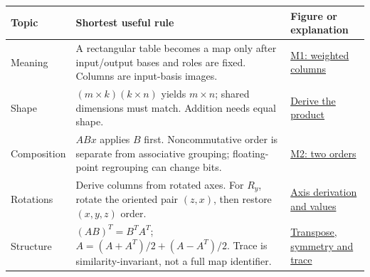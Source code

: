 {\def\LTcaptype{none} %
\begin{longtable}[]{@{}
  >{\raggedright\arraybackslash}p{}
  >{\raggedright\arraybackslash}p{}
  >{\raggedright\arraybackslash}p{}@{}}
\toprule\noalign{}
\begin{minipage}[b]{\linewidth}\raggedright
Topic
\end{minipage} & \begin{minipage}[b]{\linewidth}\raggedright
Shortest useful rule
\end{minipage} & \begin{minipage}[b]{\linewidth}\raggedright
Figure or explanation
\end{minipage} \\
\midrule\noalign{}
\endhead
\bottomrule\noalign{}
\endlastfoot
Meaning & A rectangular table becomes a map only after input/output bases and roles are fixed. Columns are input-basis images. & \href{Continuous\%20Notes/Computing\%20Foundations\%20-\%20From\%20Bits\%20to\%20C++\%20and\%20Systems\%20APIs\#Figure\%20M1\%20-\%20Coordinates\%20weight\%20the\%20new\%20basis\%20directions/}{M1: weighted columns} \\
Shape & \((m\times k)(k\times n)\) yields \(m\times n\); shared dimensions must match. Addition needs equal shape. & \href{Continuous\%20Notes/Computing\%20Foundations\%20-\%20From\%20Bits\%20to\%20C++\%20and\%20Systems\%20APIs\#Combining\%20rules\%20explains\%20the\%20multiplication\%20law/}{Derive the product} \\
Composition & \(ABx\) applies \(B\) first. Noncommutative order is separate from associative grouping; floating-point regrouping can change bits. & \href{Continuous\%20Notes/Computing\%20Foundations\%20-\%20From\%20Bits\%20to\%20C++\%20and\%20Systems\%20APIs\#Figure\%20M2\%20-\%20The\%20same\%20operations\%20give\%20different\%20results\%20in\%20different\%20orders/}{M2: two orders} \\
Rotations & Derive columns from rotated axes. For \(R_y\), rotate the oriented pair \((z,x)\), then restore \((x,y,z)\) order. & \href{Continuous\%20Notes/Computing\%20Foundations\%20-\%20From\%20Bits\%20to\%20C++\%20and\%20Systems\%20APIs\#The\%20oriented\%20plane\%20explains\%20the\%20Y-rotation\%20signs/}{Axis derivation and values} \\
Structure & \((AB)^T=B^TA^T\); \(A=(A+A^T)/2+(A-A^T)/2\). Trace is similarity-invariant, not a full map identifier. & \href{Continuous\%20Notes/Computing\%20Foundations\%20-\%20From\%20Bits\%20to\%20C++\%20and\%20Systems\%20APIs\#Transpose\%20lets\%20us\%20compare\%20measurements\%20and\%20structure/}{Transpose, symmetry and trace} \\

\end{longtable}}
